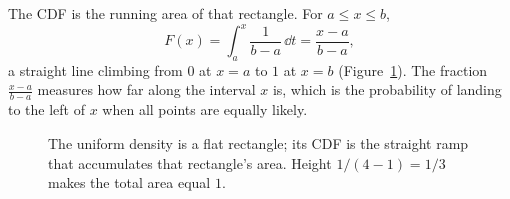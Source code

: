 The CDF is the running area of that rectangle. For $a \le x \le b$,
\[
  F(x) = \int_a^x \frac{1}{b-a}\,\dd t = \frac{x-a}{b-a},
\]
a straight line climbing from $0$ at $x=a$ to $1$ at $x=b$ (Figure~\ref{ch11:fig-uniform}).
The fraction $\tfrac{x-a}{b-a}$ measures how far along the interval $x$ is, which is the probability of landing to the left of $x$ when all points are equally likely.

\begin{figure}[H]
\centering
{}
\caption{The uniform density is a flat rectangle; its CDF is the straight ramp
that accumulates that rectangle's area. Height $1/(4-1)=1/3$ makes the total
area equal $1$.}
\label{ch11:fig-uniform}
\end{figure}
